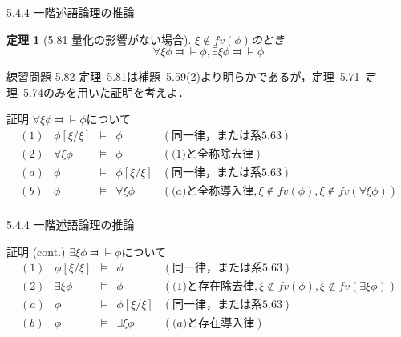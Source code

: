 \documentclass[dvipdfmx,11pt]{beamer}
\newtheorem{theo}[theorem]{定理}
\begin{document}
\begin{frame}{5.4.4 一階述語論理の推論}
  \begin{theo}[5.81 量化の影響がない場合]
    \(\xi \not \in \textit{fv}(\phi)\)のとき
    \[
    \forall \xi \phi \Dashv \vDash \phi, \exists \xi \phi \Dashv \vDash \phi
    \]
  \end{theo}
  \begin{block}{練習問題 5.82}
    定理~5.81は補題~5.59(2)より明らかであるが，定理~5.71--定理~5.74のみを用いた証明を考えよ．
  \end{block}
  \begin{block}{証明}
    \(\forall \xi \phi \Dashv \vDash \phi\)について
    \[
    \begin{array}{rrcll}
      (1) & \phi [ \xi / \xi ] & \vDash & \phi & (\textit{同一律，または系5.63}) \\
      (2) & \forall \xi \phi & \vDash & \phi & (\textit{(1)と全称除去律}) \\
      (a) & \phi & \vDash & \phi [ \xi / \xi ] & (\textit{同一律，または系5.63}) \\
      (b) & \phi & \vDash & \forall \xi \phi & (\textit{(a)と全称導入律}, \xi \not \in \textit{fv}(\phi), \xi \not \in \textit{fv}(\forall\xi\phi)) \\
    \end{array}
    \]
  \end{block}
\end{frame}

\begin{frame}{5.4.4 一階述語論理の推論}
  \begin{block}{証明 (cont.)}
    \(\exists \xi \phi \Dashv \vDash \phi\)について
    \[
    \begin{array}{rrcll}
      (1) & \phi [ \xi / \xi ] & \vDash & \phi & (\textit{同一律，または系5.63}) \\
      (2) & \exists \xi \phi & \vDash & \phi & (\textit{(1)と存在除去律}, \xi \not \in \textit{fv}(\phi), \xi \not \in \textit{fv}(\exists\xi\phi)) \\
      (a) & \phi & \vDash & \phi [ \xi / \xi ] & (\textit{同一律，または系5.63}) \\
      (b) & \phi & \vDash & \exists \xi \phi & (\textit{(a)と存在導入律}) \\
    \end{array}
    \]
  \end{block}
\end{frame}
\end{document}
